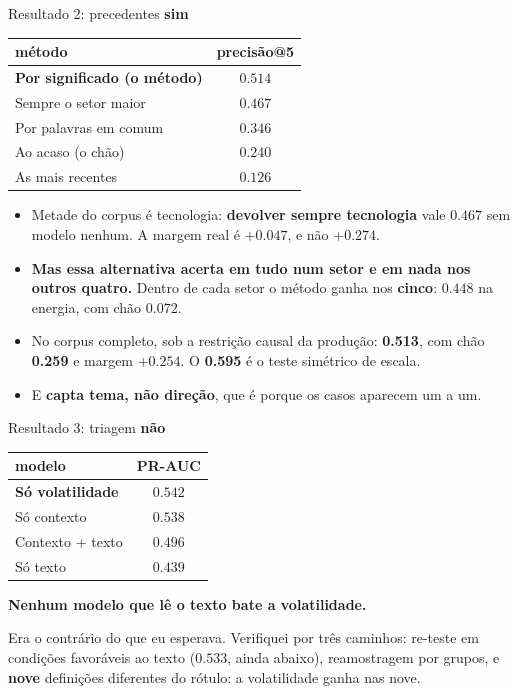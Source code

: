 \documentclass[aspectratio=169]{beamer}
\begin{document}
\begin{frame}{Resultado 2: precedentes \textcolor{green!50!black}{\textbf{sim}}}
\centering
\begin{tabular}{lc}
\toprule
\textbf{método} & \textbf{precisão@5} \\
\midrule
\textbf{Por significado (o método)} & $\mathbf{0.514}$ \\
Sempre o setor maior & $0.467$ \\
Por palavras em comum & $0.346$ \\
Ao acaso (o chão) & $0.240$ \\
As mais recentes & $0.126$ \\
\bottomrule
\end{tabular}
\vspace{2mm}

\begin{itemize}
  \small
  \item Metade do corpus é tecnologia: \textbf{devolver sempre tecnologia} vale $0.467$
        sem modelo nenhum. A margem real é $+0.047$, e não $+0.274$.
  \item \textbf{Mas essa alternativa acerta em tudo num setor e em nada nos outros quatro.}
        Dentro de cada setor o método ganha nos \textbf{cinco}: $0.448$ na energia, com chão $0.072$.
  \item No corpus completo, sob a restrição causal da produção: \textbf{0.513}, com chão
        \textbf{0.259} e margem \textbf{$+0.254$}. O \textbf{0.595} é o teste simétrico de escala.
  \item E \textbf{capta tema, não direção}, que é porque os casos aparecem um a um.
\end{itemize}
\end{frame}

\begin{frame}{Resultado 3: triagem \textcolor{red!60!black}{\textbf{não}}}
\centering
\begin{tabular}{lc}
\toprule
\textbf{modelo} & \textbf{PR-AUC} \\
\midrule
\textbf{Só volatilidade} & $\mathbf{0.542}$ \\
Só contexto & $0.538$ \\
Contexto + texto & $0.496$ \\
Só texto & $0.439$ \\
\bottomrule
\end{tabular}
\vspace{3mm}

\begin{center}
\textbf{Nenhum modelo que lê o texto bate a volatilidade.}
\end{center}
\vspace{2mm}
\footnotesize
Era o contrário do que eu esperava. Verifiquei por três caminhos:
re-teste em condições favoráveis ao texto ($0.533$, ainda abaixo),
reamostragem por grupos, e \textbf{nove} definições diferentes do rótulo: a volatilidade ganha
nas nove.
\end{frame}
\end{document}
